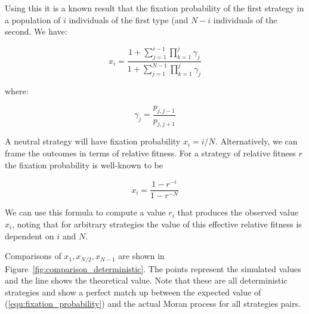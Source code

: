 \documentclass{article}
\begin{document}
Using this it is a known result that the fixation probability of the first
strategy in a population of \(i\) individuals of the first type (and \(N-i\)
individuals of the second. We have:

\begin{equation}\label{equ:fixation_probability}
x_i = \frac{1 + \sum_{j=1}^{i-1}\prod_{k=1}^{j}\gamma_j}{1 + \sum_{j=1}^{N-1}
      \prod_{k=1}^{j}\gamma_j}
\end{equation}

where:

\[
\gamma_j = \frac{p_{j, j-1}}{p_{j, j+1}}
\]

A neutral strategy will have fixation probability $x_i = i/N$. Alternatively,
we can frame the outcomes in terms of relative fitness. For a strategy
of relative fitness $r$ the fixation probability is well-known to be

\[ x_i = \frac{1 - r^{-i}}{1 - r^{-N}} \]

We can use this formula to compute a value $r_i$ that produces the observed
value $x_i$, noting that for arbitrary strategies the value of this
effective relative fitness is dependent on $i$ and $N$.

Comparisons of \(x_1, x_{N/2}, x_{N-1}\) are shown in
Figure~\ref{fig:comparison_deterministic}. The points represent the simulated
values and the line shows the theoretical value. Note that these are all
deterministic strategies and show a perfect match up between the expected value
of (\ref{equ:fixation_probability}) and the actual Moran process for all
strategies pairs.
\end{document}
